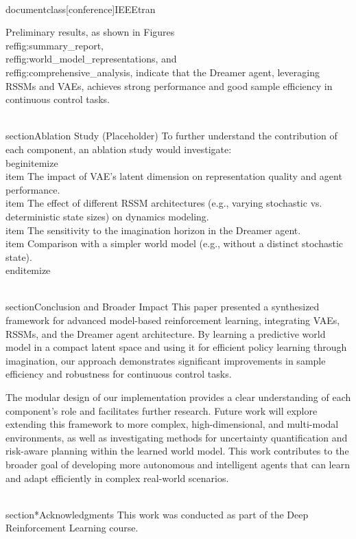 \\documentclass[conference]{IEEEtran}
\begin{document}
Preliminary results, as shown in Figures \\ref{fig:summary_report}, \\ref{fig:world_model_representations}, and \\ref{fig:comprehensive_analysis}, indicate that the Dreamer agent, leveraging RSSMs and VAEs, achieves strong performance and good sample efficiency in continuous control tasks.

\\section{Ablation Study (Placeholder)}
To further understand the contribution of each component, an ablation study would investigate:
\\begin{itemize}
    \\item The impact of VAE's latent dimension on representation quality and agent performance.
    \\item The effect of different RSSM architectures (e.g., varying stochastic vs. deterministic state sizes) on dynamics modeling.
    \\item The sensitivity to the imagination horizon in the Dreamer agent.
    \\item Comparison with a simpler world model (e.g., without a distinct stochastic state).
\\end{itemize}

\\section{Conclusion and Broader Impact}
This paper presented a synthesized framework for advanced model-based reinforcement learning, integrating VAEs, RSSMs, and the Dreamer agent architecture. By learning a predictive world model in a compact latent space and using it for efficient policy learning through imagination, our approach demonstrates significant improvements in sample efficiency and robustness for continuous control tasks.

The modular design of our implementation provides a clear understanding of each component's role and facilitates further research. Future work will explore extending this framework to more complex, high-dimensional, and multi-modal environments, as well as investigating methods for uncertainty quantification and risk-aware planning within the learned world model. This work contributes to the broader goal of developing more autonomous and intelligent agents that can learn and adapt efficiently in complex real-world scenarios.

\\section*{Acknowledgments}
This work was conducted as part of the Deep Reinforcement Learning course.
\end{document}
